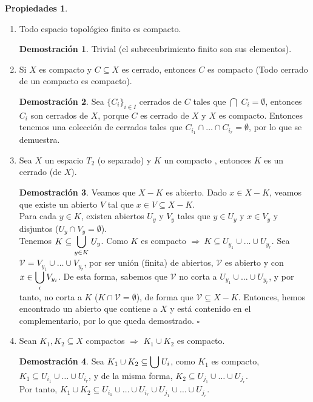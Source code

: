 \documentclass[12pt,twoside]{report}
\newcommand\mc[1]{\mathcal{#1}}
\theoremstyle{azul}
\theoremstyle{azul2}
\theoremstyle{plain}
\theoremstyle{definition}
\newtheorem*{propi}{Propiedades}
\newtheorem*{dem}{Demostración}
\theoremstyle{remark}
\begin{document}
\begin{propi} \:    
\begin{enumerate}[1)]
    \item Todo espacio topológico finito es compacto.
    \begin{dem}
    Trivial (el subrecubrimiento finito son sus elementos).
    \end{dem}
    \item Si $X$ es compacto y $C \subseteq X$ es cerrado, entonces $C$ es compacto (Todo cerrado de un compacto es compacto).
    \begin{dem}
    Sea $\{C_i\}_{i \in I}$ cerrados de $C$ tales que $\bigcap \; C_i =\emptyset$, entonces $C_i$ son cerrados de $X$, porque $C$ es cerrado de $X$ y $X$ es compacto. Entonces tenemos una colección de cerrados tales que $C_{i_1} \cap \ldots \cap C_{i_r}=\emptyset$, por lo que se demuestra.
    \end{dem} 
    \item Sea $X$ un espacio $T_2$ (o separado) y $K$ un compacto , entonces  $K$ es un cerrado (de $X$). 
    \begin{dem}
    Veamos que $X-K$ es abierto. Dado $x \in X-K$, veamos que existe un abierto $V$ tal que $x \in V \subseteq X-K$. \\ Para cada $y \in K$, existen abiertos $U_y$ y $V_y$ tales que $y \in U_y$ y $x \in V_y$ y disjuntos ($U_y \cap V_y = \emptyset$).\\
    Tenemos $K \subseteq \underset{y \in K}{\mathlarger{\bigcup}} \; U_y$. Como $K$ es compacto $\Rightarrow \:K \subseteq U_{y_1} \cup \ldots \cup U_{y_r}$.
    Sea $\mc{V}=V_{y_1} \cup \ldots \cup V_{y_r}$, por ser unión (finita) de abiertos, $\mc{V}$ es abierto y con $x \in \underset{i}{\mathlarger{\bigcup}} \: V_{y_i}$. De esta forma, sabemos que $\mc{V}$ no corta a $U_{y_1} \cup \ldots \cup U_{y_r}$, y por tanto, no corta a $K$ ($K \cap \mc{V} = \emptyset$), de forma que $\mc{V} \subseteq X-K$. Entonces, hemos encontrado un abierto que contiene a $X$ y está contenido en el complementario, por lo que queda demostrado. \hfill $\square$
    \end{dem}
    \item Sean $K_1, K_2 \subseteq X$ compactos $\Rightarrow$ $K_1 \cup K_2$ es compacto.
    \begin{dem}
    Sea $K_1 \cup K_2 \subseteq \mathlarger{\bigcup} \: U_i$, como $K_1$ es compacto, $K_1 \subseteq  U_{i_1} \cup \ldots \cup U_{i_r}$, y de la misma forma, $K_2 \subseteq U_{j_1} \cup \ldots \cup U_{j_r}$. \\ Por tanto, $K_1 \cup K_2 \subseteq U_{i_1} \cup \ldots \cup U_{i_r} \cup U_{j_1} \cup \ldots \cup U_{j_r}$.

\end{dem}
\end{enumerate}
\end{propi}
\end{document}

